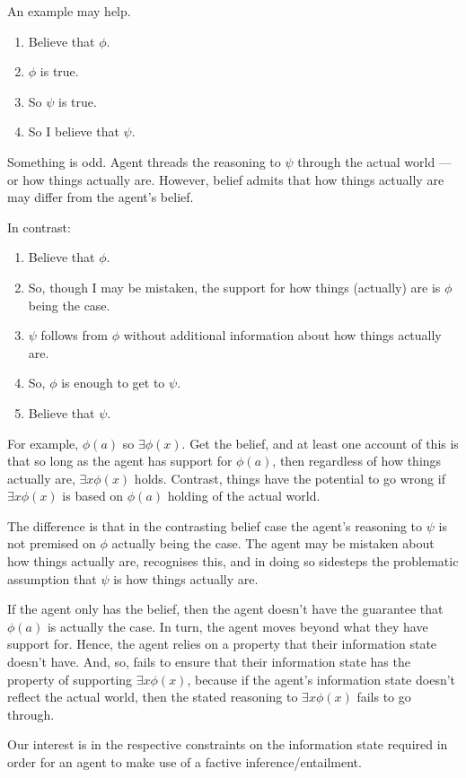 \documentclass[10pt]{article}
\begin{document}
\begin{note}
An example may help.

\begin{enumerate}
\item Believe that \(\phi\).
\item \(\phi\) is true.
\item So \(\psi\) is true.
\item So I believe that \(\psi\).
\end{enumerate}

Something is odd.
Agent threads the reasoning to \(\psi\) through the actual world --- or how things actually are.
However, belief admits that how things actually are may differ from the agent's belief.

In contrast:
\begin{enumerate}
\item Believe that \(\phi\).
\item So, though I may be mistaken, the support for how things (actually) are is \(\phi\) being the case.
\item \(\psi\) follows from \(\phi\) without additional information about how things actually are.
\item So, \(\phi\) is enough to get to \(\psi\).
\item Believe that \(\psi\).
\end{enumerate}

For example, \(\phi(a)\) so \(\exists \phi(x)\).
Get the belief, and at least one account of this is that so long as the agent has support for \(\phi(a)\), then regardless of how things actually are, \(\exists x \phi(x)\) holds.
Contrast, things have the potential to go wrong if \(\exists x \phi(x)\) is based on \(\phi(a)\) holding of the actual world.

The difference is that in the contrasting belief case the agent's reasoning to \(\psi\) is not premised on \(\phi\) actually being the case.
The agent may be mistaken about how things actually are, recognises this, and in doing so sidesteps the problematic assumption that \(\psi\) is how things actually are.

If the agent only has the belief, then the agent doesn't have the guarantee that \(\phi(a)\) is actually the case.
In turn, the agent moves beyond what they have support for.
Hence, the agent relies on a property that their information state doesn't have.
And, so, fails to ensure that their information state has the property of supporting \(\exists x \phi(x)\), because if the agent's information state doesn't reflect the actual world, then the stated reasoning to \(\exists x \phi(x)\) fails to go through.

Our interest is in the respective constraints on the information state required in order for an agent to make use of a factive inference/entailment.
\end{note}
\end{document}
